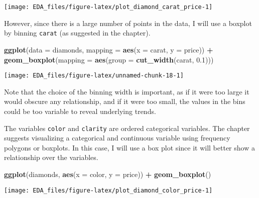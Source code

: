 \documentclass[]{book}
\newenvironment{Shaded}{\begin{snugshade}}{\end{snugshade}}
\newcommand{\DataTypeTok}[1]{\textcolor[rgb]{0.13,0.29,0.53}{#1}}
\newcommand{\FloatTok}[1]{\textcolor[rgb]{0.00,0.00,0.81}{#1}}
\newcommand{\KeywordTok}[1]{\textcolor[rgb]{0.13,0.29,0.53}{\textbf{#1}}}
\newcommand{\NormalTok}[1]{#1}
\newcommand{\OperatorTok}[1]{\textcolor[rgb]{0.81,0.36,0.00}{\textbf{#1}}}
\newcommand{\StringTok}[1]{\textcolor[rgb]{0.31,0.60,0.02}{#1}}
\theoremstyle{plain}
\theoremstyle{remark}
\theoremstyle{definition}
\theoremstyle{definition}
\theoremstyle{definition}
\theoremstyle{remark}
\begin{document}
\begin{center}\texttt{[image: EDA\_files/figure-latex/plot\_diamond\_carat\_price-1]} \end{center}

However, since there is a large number of points in the data, I will use
a boxplot by binning \texttt{carat} (as suggested in the chapter).

\begin{Shaded}
\begin{Highlighting}[]
\KeywordTok{ggplot}\NormalTok{(}\DataTypeTok{data =}\NormalTok{ diamonds, }\DataTypeTok{mapping =} \KeywordTok{aes}\NormalTok{(}\DataTypeTok{x =}\NormalTok{ carat, }\DataTypeTok{y =}\NormalTok{ price)) }\OperatorTok{+}
\StringTok{  }\KeywordTok{geom_boxplot}\NormalTok{(}\DataTypeTok{mapping =} \KeywordTok{aes}\NormalTok{(}\DataTypeTok{group =} \KeywordTok{cut_width}\NormalTok{(carat, }\FloatTok{0.1}\NormalTok{)))}
\end{Highlighting}
\end{Shaded}

\begin{center}\texttt{[image: EDA\_files/figure-latex/unnamed-chunk-18-1]} \end{center}

Note that the choice of the binning width is important, as if it were
too large it would obscure any relationship, and if it were too small,
the values in the bins could be too variable to reveal underlying
trends.

The variables \texttt{color} and \texttt{clarity} are ordered
categorical variables. The chapter suggests visualizing a categorical
and continuous variable using frequency polygons or boxplots. In this
case, I will use a box plot since it will better show a relationship
over the variables.

\begin{Shaded}
\begin{Highlighting}[]
\KeywordTok{ggplot}\NormalTok{(diamonds, }\KeywordTok{aes}\NormalTok{(}\DataTypeTok{x =}\NormalTok{ color, }\DataTypeTok{y =}\NormalTok{ price)) }\OperatorTok{+}
\StringTok{  }\KeywordTok{geom_boxplot}\NormalTok{()}
\end{Highlighting}
\end{Shaded}

\begin{center}\texttt{[image: EDA\_files/figure-latex/plot\_diamond\_color\_price-1]} \end{center}
\end{document}
